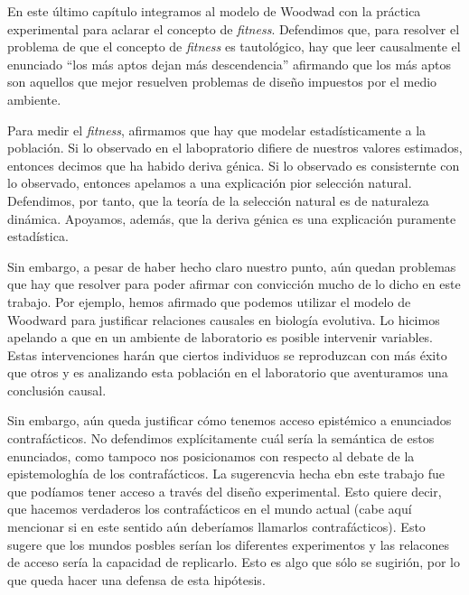 En este último capítulo integramos al modelo de Woodwad con la práctica experimental para aclarar el concepto de \emph{fitness}. Defendimos que, para resolver el problema de que el concepto de \emph{fitness} es tautológico, hay que leer causalmente el enunciado ``los más aptos dejan más descendencia'' afirmando que los más aptos son aquellos que mejor resuelven problemas de diseño impuestos por el medio ambiente.

Para medir el \emph{fitness}, afirmamos que hay que modelar estadísticamente a la población. Si lo observado en el labopratorio difiere de nuestros valores estimados, entonces decimos que ha habido deriva génica. Si lo observado es consisternte con lo observado, entonces apelamos a una explicación pior selección natural. Defendimos, por tanto, que la teoría de la selección natural es de naturaleza dinámica. Apoyamos, además, que la deriva génica es una explicación puramente estadística.

Sin embargo, a pesar de haber hecho claro nuestro punto, aún quedan problemas que hay que resolver para poder afirmar con convicción mucho de lo dicho en este trabajo. Por ejemplo, hemos afirmado que podemos utilizar el modelo de Woodward para justificar relaciones causales en biología evolutiva. Lo hicimos apelando a que en un ambiente de laboratorio es posible intervenir variables. Estas intervenciones harán que ciertos individuos se reproduzcan con más éxito que otros y es analizando esta población en el laboratorio que aventuramos una conclusión causal.

Sin embargo, aún queda justificar cómo tenemos acceso epistémico a enunciados contrafácticos. No defendimos explícitamente cuál sería la semántica de estos enunciados, como tampoco nos posicionamos con respecto al debate de la epistemologhía de los contrafácticos. La sugerencvia hecha ebn este trabajo fue que podíamos tener acceso a través del diseño experimental. Esto quiere decir, que hacemos verdaderos los contrafácticos en el mundo actual (cabe aquí mencionar si en este sentido aún deberíamos llamarlos contrafácticos). Esto sugere que los mundos posbles serían los diferentes experimentos y las relacones de acceso sería la capacidad de replicarlo. Esto es algo que sólo se sugirión, por lo que queda hacer una defensa de esta hipótesis.



